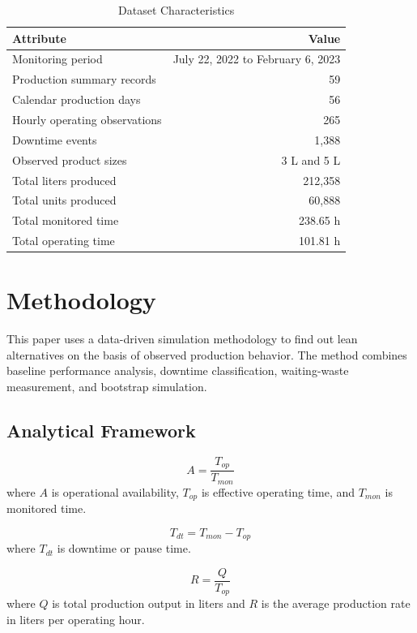 \documentclass[12pt,a4paper]{article}
\begin{document}
\begin{table}[H]
\centering
\caption{Dataset Characteristics}
\begin{tabular}{lr}
\toprule
\textbf{Attribute} & \textbf{Value} \\
\midrule
Monitoring period & July 22, 2022 to February 6, 2023 \\
Production summary records & 59 \\
Calendar production days & 56 \\
Hourly operating observations & 265 \\
Downtime events & 1,388 \\
Observed product sizes & 3 L and 5 L \\
Total liters produced & 212,358 \\
Total units produced & 60,888 \\
Total monitored time & 238.65 h \\
Total operating time & 101.81 h \\
\bottomrule
\end{tabular}
\end{table}

\section{Methodology}
This paper uses a data-driven simulation methodology to find out lean alternatives on the basis of observed production behavior. The method combines baseline performance analysis, downtime classification, waiting-waste measurement, and bootstrap simulation.

\subsection{Analytical Framework}
\begin{equation}
A = \frac{T_{op}}{T_{mon}}
\end{equation}
where $A$ is operational availability, $T_{op}$ is effective operating time, and $T_{mon}$ is monitored time.

\begin{equation}
T_{dt} = T_{mon} - T_{op}
\end{equation}
where $T_{dt}$ is downtime or pause time.

\begin{equation}
R = \frac{Q}{T_{op}}
\end{equation}
where $Q$ is total production output in liters and $R$ is the average production rate in liters per operating hour.
\end{document}

